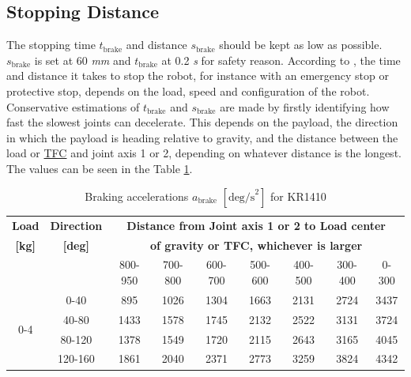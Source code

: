 \subsection{Stopping Distance}
\label{subsec:stoppage-distance}
The stopping time \hyperref[sym:t-brake]{$t_{\text{brake}}$} and distance \hyperref[sym:s-brake]{$s_{\text{brake}}$} should be kept as low as possible. \hyperref[sym:s-brake]{$s_{\text{brake}}$} is set at 60 \textit{mm} and \hyperref[sym:t-brake]{$t_{\text{brake}}$} at 0.2 \textit{s} for safety reason.
According to \cite[page 35]{kassow-manual}, the time and distance it takes to stop the robot, for instance with an emergency stop or protective stop, depends on the load, speed
and configuration of the robot. Conservative estimations of \hyperref[sym:t-brake]{$t_{\text{brake}}$} and \hyperref[sym:s-brake]{$s_{\text{brake}}$} are made by firstly identifying how fast the
slowest joints can decelerate. This depends on the payload, the direction in which the payload is heading
relative to gravity, and the distance between the load or \hyperref[acro:TFC]{TFC} and joint axis 1 or 2, depending on whatever
distance is the longest.
The values can be seen in the Table \ref{tab:braking_accelerations}.


    \begin{table}[h]
        \centering
        \renewcommand{\arraystretch}{1.2} %
        \small
        \setlength{\tabcolsep}{4.5pt} %
        \begin{tabular}{cc|*{7}{c}}
            \hline
            \textbf{Load} & \textbf{Direction} & 
            \multicolumn{7}{c}{\textbf{Distance from Joint axis 1 or 2 to Load center}} \\
            \textbf{[kg]} & \textbf{[deg]} & 
            \multicolumn{7}{c}{\textbf{of gravity or TFC, whichever is larger}} \\
            \cline{3-9}
            & & 800-950 & 700-800 & 600-700 & 500-600 & 400-500 & 300-400 & 0-300 \\
            \hline
            \multirow{4}{*}{0-4}  & 0-40  & 895  & 1026 & 1304 & 1663 & 2131 & 2724 & 3437 \\
                                & 40-80 & 1433 & 1578 & 1745 & 2132 & 2522 & 3131 & 3724 \\
                                & 80-120 & 1378 & 1549 & 1720 & 2115 & 2643 & 3165 & 4045 \\
                                & 120-160 & 1861 & 2040 & 2371 & 2773 & 3259 & 3824 & 4342 \\
            \hline
        \end{tabular}
        \caption{Braking accelerations \hyperref[sym:a-brake]{$a_{\text{brake}}$} \textit{$[\text{deg/s}^2]$} for KR1410}
        \label{tab:braking_accelerations}
    \end{table}


